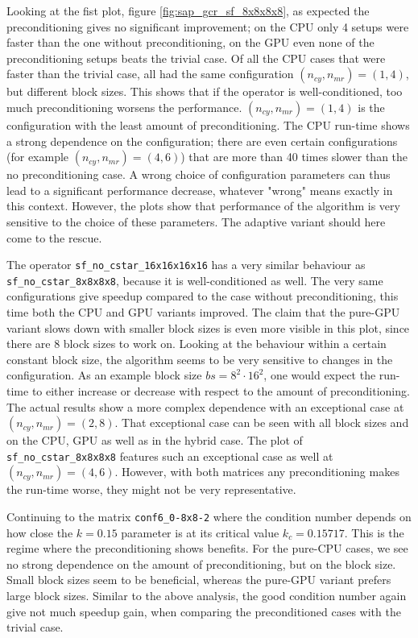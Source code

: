 \documentclass{article}
\theoremstyle{plain} %
\theoremstyle{convention} %
\theoremstyle{remark} %
\def\code#1{\texttt{#1}}
\numberwithin{equation}{section}
\begin{document}
Looking at the fist plot, figure \ref{fig:sap_gcr_sf_8x8x8x8}, as expected the preconditioning gives no significant improvement; on the CPU only \num{4} setups were faster than the one without preconditioning, on the GPU even none of the preconditioning setups beats the trivial case. Of all the CPU cases that were faster than the trivial case, all had the same configuration $(n_{cy}, n_{mr}) = (1,4)$, but different block sizes. This shows that if the operator is well-conditioned, too much preconditioning worsens the performance. $(n_{cy}, n_{mr}) = (1,4)$ is the configuration with the least amount of preconditioning. The CPU run-time shows a strong dependence on the configuration; there are even certain configurations (for example $(n_{cy}, n_{mr}) = (4,6)$) that are more than \num{40} times slower than the no preconditioning case. A wrong choice of configuration parameters can thus lead to a significant performance decrease, whatever "wrong" means exactly in this context. However, the plots show that performance of the algorithm is very sensitive to the choice of these parameters. The adaptive variant should here come to the rescue.

The operator \code{sf\_no\_cstar\_16x16x16x16} has a very similar behaviour as \code{sf\_no\_cstar\_8x8x8x8}, because it is well-conditioned as well. The very same configurations give speedup compared to the case without preconditioning, this time both the CPU and GPU variants improved. The claim that the pure-GPU variant slows down with smaller block sizes is even more visible in this plot, since there are \num{8} block sizes to work on. Looking at the behaviour within a certain constant block size, the algorithm seems to be very sensitive to changes in the configuration. As an example block size $bs= 8^2 \cdot 16^2$, one would expect the run-time to either increase or decrease with respect to the amount of preconditioning. The actual results show a more complex dependence with an exceptional case at $(n_{cy}, n_{mr}) = (2,8)$. That exceptional case can be seen with all block sizes and on the CPU, GPU as well as in the hybrid case. The plot of \code{sf\_no\_cstar\_8x8x8x8} features such an exceptional case as well at $(n_{cy}, n_{mr}) = (4,6)$. However, with both matrices any preconditioning makes the run-time worse, they might not be very representative.

Continuing to the matrix \code{conf6\_0-8x8-2} where the condition number depends on how close the $k = 0.15$ parameter is at its critical value $k_c = 0.15717$. This is the regime where the preconditioning shows benefits. For the pure-CPU cases, we see no strong dependence on the amount of preconditioning, but on the block size. Small block sizes seem to be beneficial, whereas the pure-GPU variant prefers large block sizes. Similar to the above analysis, the good condition number again give not much speedup gain, when comparing the preconditioned cases with the trivial case.
\end{document}
